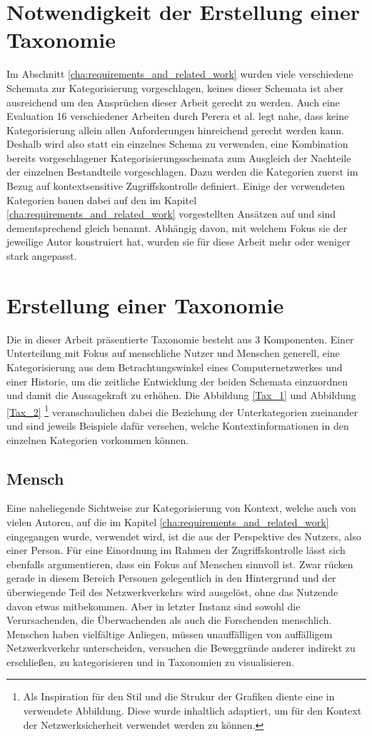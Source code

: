 \section{Notwendigkeit der Erstellung einer Taxonomie }
Im Abschnitt \ref{cha:requirements_and_related_work} wurden viele verschiedene Schemata zur Kategorisierung vorgeschlagen, keines dieser Schemata ist aber ausreichend um den Ansprüchen dieser Arbeit gerecht zu werden. Auch eine Evaluation 16 verschiedener Arbeiten durch Perera et al. \cite{perera_context_2014} legt nahe, dass keine Kategorisierung allein allen Anforderungen hinreichend gerecht werden kann.
Deshalb wird also statt ein einzelnes Schema zu verwenden, eine Kombination bereits vorgeschlagener Kategorisierungsschemata zum Ausgleich der Nachteile der einzelnen Bestandteile vorgeschlagen. Dazu werden die Kategorien zuerst im Bezug auf kontextsensitive Zugriffskontrolle definiert. Einige der verwendeten Kategorien bauen dabei auf den im Kapitel \ref{cha:requirements_and_related_work} vorgestellten Ansätzen auf und sind dementsprechend gleich benannt. Abhängig davon, mit welchem Fokus sie der jeweilige Autor konstruiert hat, wurden sie für diese Arbeit mehr oder weniger stark angepasst.
\section{Erstellung einer Taxonomie}
\label{sec:tax_erstellung}
Die in dieser Arbeit präsentierte Taxonomie besteht aus 3 Komponenten. Einer Unterteilung mit Fokus auf menschliche Nutzer und Menschen generell, eine Kategorisierung aus dem Betrachtungswinkel eines Computernetzwerkes und einer Historie, um die zeitliche Entwicklung der beiden Schemata einzuordnen und damit die Aussagekraft zu erhöhen.
Die Abbildung \ref{Tax_1} und Abbildung \ref{Tax_2} \footnote{Als Inspiration für den Stil und die Strukur der Grafiken diente eine in \cite{perera_context_2014} verwendete Abbildung. Diese wurde inhaltlich adaptiert, um für den Kontext der Netzwerksicherheit verwendet werden zu können.}  veranschaulichen dabei die Beziehung der Unterkategorien zueinander und sind jeweils Beispiele dafür versehen, welche Kontextinformationen in den einzelnen Kategorien vorkommen können. 
\subsection{Mensch}
Eine naheliegende Sichtweise zur Kategorisierung von Kontext, welche auch von vielen Autoren, auf die im Kapitel \ref{cha:requirements_and_related_work} eingegangen wurde, verwendet wird, ist die aus der Perspektive des Nutzers, also einer Person. Für eine Einordnung im Rahmen der Zugriffskontrolle lässt sich ebenfalls argumentieren, dass ein Fokus auf Menschen sinnvoll ist. Zwar rücken gerade in diesem Bereich Personen gelegentlich in den Hintergrund und der überwiegende Teil des Netzwerkverkehrs wird ausgelöst, ohne das Nutzende davon etwas mitbekommen. Aber in letzter Instanz sind sowohl die Verursachenden, die Überwachenden als auch die Forschenden menschlich. Menschen haben vielfältige Anliegen, müssen unauffälligen von auffälligem Netzwerkverkehr unterscheiden, versuchen die Beweggründe anderer indirekt zu erschließen, zu kategorisieren und in Taxonomien zu visualisieren.

